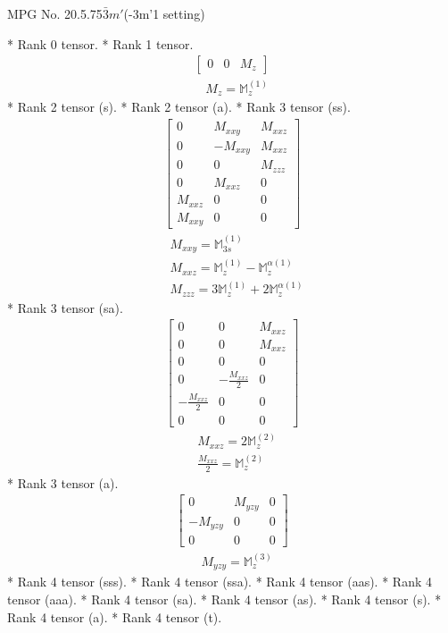 \documentclass[fleqn,8pt,landscape]{jsarticle}
\begin{document}
\setcounter{MaxMatrixCols}{32}

\renewcommand{\tablename}{Table~}
\renewcommand{\figurename}{Figure~}
\begin{center}
\LARGE
MPG No. 20.5.75\quad$\bar{3}m'$\quad(-3m'1 setting)
\end{center}
* Rank 0 tensor.
* Rank 1 tensor.
\begin{align*}
\begin{bmatrix} 0 & 0 & M_{z} \end{bmatrix}
\end{align*}
\begin{align*}
& M_{z} = \mathbb{M}_{z}^{(1)}
\end{align*}
* Rank 2 tensor (s).
* Rank 2 tensor (a).
* Rank 3 tensor (ss).
\begin{align*}
\begin{bmatrix} 0 & M_{xxy} & M_{xxz} \\ 0 & - M_{xxy} & M_{xxz} \\ 0 & 0 & M_{zzz} \\ 0 & M_{xxz} & 0 \\ M_{xxz} & 0 & 0 \\ M_{xxy} & 0 & 0 \end{bmatrix}
\end{align*}
\begin{align*}
& M_{xxy} = \mathbb{M}_{3s}^{(1)} \\
& M_{xxz} = \mathbb{M}_{z}^{(1)} - \mathbb{M}_{z}^{\alpha(1)} \\
& M_{zzz} = 3 \mathbb{M}_{z}^{(1)} + 2 \mathbb{M}_{z}^{\alpha(1)}
\end{align*}
* Rank 3 tensor (sa).
\begin{align*}
\begin{bmatrix} 0 & 0 & M_{xxz} \\ 0 & 0 & M_{xxz} \\ 0 & 0 & 0 \\ 0 & - \frac{M_{xxz}}{2} & 0 \\ - \frac{M_{xxz}}{2} & 0 & 0 \\ 0 & 0 & 0 \end{bmatrix}
\end{align*}
\begin{align*}
& M_{xxz} = 2 \mathbb{M}_{z}^{(2)} \\
& \frac{M_{xxz}}{2} = \mathbb{M}_{z}^{(2)}
\end{align*}
* Rank 3 tensor (a).
\begin{align*}
\begin{bmatrix} 0 & M_{yzy} & 0 \\ - M_{yzy} & 0 & 0 \\ 0 & 0 & 0 \end{bmatrix}
\end{align*}
\begin{align*}
& M_{yzy} = \mathbb{M}_{z}^{(3)}
\end{align*}
* Rank 4 tensor (sss).
* Rank 4 tensor (ssa).
* Rank 4 tensor (aas).
* Rank 4 tensor (aaa).
* Rank 4 tensor (sa).
* Rank 4 tensor (as).
* Rank 4 tensor (s).
* Rank 4 tensor (a).
* Rank 4 tensor (t).
\end{document}
